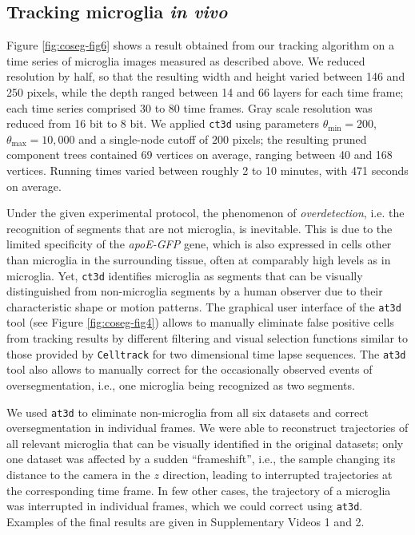 \subsection{Tracking microglia \textit{in vivo}}

Figure \ref{fig:coseg-fig6} shows a result obtained from
our tracking algorithm on a time series of microglia images measured
as described above. We reduced resolution by half, so that the
resulting width and height varied between 146 and 250 pixels, while
the depth ranged between 14 and 66 layers for each time frame; each
time series comprised 30 to 80 time frames. Gray scale resolution was
reduced from 16 bit to 8 bit. We applied \texttt{ct3d} using
parameters $\theta_{\min}=200$, $\theta_{\max}=10,000$ and a
single-node cutoff of $200$ pixels; the resulting pruned component
trees contained 69 vertices on average, ranging between 40 and 168
vertices. Running times varied between roughly 2 to 10 minutes, with
471 seconds on average. 

Under the given experimental protocol, the phenomenon of
\emph{overdetection}, i.e. the recognition of segments that are not
microglia, is inevitable. This is due to the limited specificity of
the \emph{apoE-GFP} gene, which is also expressed in cells other than
microglia in the surrounding tissue, often at comparably high levels
as in microglia. Yet, \texttt{ct3d} identifies microglia as segments
that can be visually distinguished from non-microglia segments by a
human observer due to their characteristic shape or motion
patterns. The graphical user interface of the \texttt{at3d} tool (see
Figure \ref{fig:coseg-fig4}) allows to manually eliminate false positive
cells from tracking results by different filtering and visual
selection functions similar to those provided by \texttt{Celltrack}
for two dimensional time lapse sequences. The \texttt{at3d} tool also
allows to manually correct for the occasionally observed events of
oversegmentation, i.e., one microglia being recognized as two segments.

We used \texttt{at3d} to eliminate non-microglia from all six datasets
and correct oversegmentation in individual frames. We were able to
reconstruct trajectories of all relevant microglia that can be
visually identified in the original datasets; only one dataset was
affected by a sudden ``frameshift'', i.e., the sample changing its
distance to the camera in the $z$ direction, leading to interrupted
trajectories at the corresponding time frame. In few other cases, the
trajectory of a microglia was interrupted in individual frames, which
we could correct using \texttt{at3d}. Examples of the final results
are given in Supplementary Videos 1 and 2.

